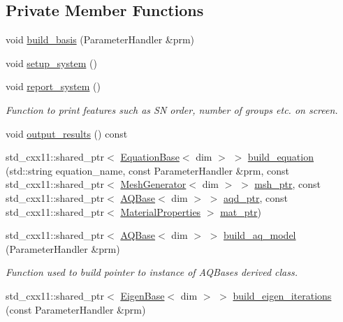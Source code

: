 \subsection*{Private Member Functions}
\begin{DoxyCompactItemize}
\item 
void \hyperlink{class_bart_driver_ade375a4999de1e775434e11d4e6dd935}{build\+\_\+basis} (Parameter\+Handler \&prm)
\item 
void \hyperlink{class_bart_driver_a54ac94a562fa8f5cdb13ba6c56965b9c}{setup\+\_\+system} ()
\item 
void \hyperlink{class_bart_driver_aaf3b0ad2798c9add9e37ca0f649c416d}{report\+\_\+system} ()
\begin{DoxyCompactList}\small\item\em Function to print features such as SN order, number of groups etc. on screen. \end{DoxyCompactList}\item 
void \hyperlink{class_bart_driver_a1c440c9add7a5ec9d28afb7d44fa23d9}{output\+\_\+results} () const
\item 
std\+\_\+cxx11\+::shared\+\_\+ptr$<$ \hyperlink{class_equation_base}{Equation\+Base}$<$ dim $>$ $>$ \hyperlink{class_bart_driver_a10475395d7db9274b69349420460243d}{build\+\_\+equation} (std\+::string equation\+\_\+name, const Parameter\+Handler \&prm, const std\+\_\+cxx11\+::shared\+\_\+ptr$<$ \hyperlink{class_mesh_generator}{Mesh\+Generator}$<$ dim $>$ $>$ \hyperlink{class_bart_driver_a976c3ba1c98180dced85019dfd56e225}{msh\+\_\+ptr}, const std\+\_\+cxx11\+::shared\+\_\+ptr$<$ \hyperlink{class_a_q_base}{A\+Q\+Base}$<$ dim $>$ $>$ \hyperlink{class_bart_driver_a818149e4acfe5a7108ef42938650ff11}{aqd\+\_\+ptr}, const std\+\_\+cxx11\+::shared\+\_\+ptr$<$ \hyperlink{class_material_properties}{Material\+Properties} $>$ \hyperlink{class_bart_driver_aef9abac579c212463a6790a0e39e6429}{mat\+\_\+ptr})
\item 
std\+\_\+cxx11\+::shared\+\_\+ptr$<$ \hyperlink{class_a_q_base}{A\+Q\+Base}$<$ dim $>$ $>$ \hyperlink{class_bart_driver_ac5d2985a0286bdac161f3c0fbb80197a}{build\+\_\+aq\+\_\+model} (Parameter\+Handler \&prm)
\begin{DoxyCompactList}\small\item\em Function used to build pointer to instance of A\+Q\+Base\textquotesingle{}s derived class. \end{DoxyCompactList}\item 
std\+\_\+cxx11\+::shared\+\_\+ptr$<$ \hyperlink{class_eigen_base}{Eigen\+Base}$<$ dim $>$ $>$ \hyperlink{class_bart_driver_abc542028ef1ab71693acba10bf017018}{build\+\_\+eigen\+\_\+iterations} (const Parameter\+Handler \&prm)

\end{DoxyCompactItemize}
